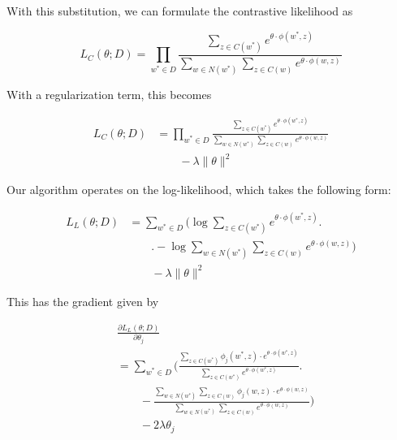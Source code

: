 \documentclass[11pt,twocolumn]{article}
\begin{document}
With this substitution, we can formulate the contrastive likelihood as

\begin{equation}
    L_C(\theta; D) = \prod_{w^*\in D} \frac{\sum_{z\in C(w^*)} e^{\theta\cdot\phi(w^*,z)}} {\sum_{w\in N(w^*)} \sum_{z\in C(w)} e^{\theta\cdot\phi(w,z)}}
\end{equation}

With a regularization term, this becomes

\begin{equation}
    \begin{split}
        L_C(\theta; D) &= \prod_{w^*\in D} \frac{\sum_{z\in C(w^*)} e^{\theta\cdot\phi(w^*,z)}} {\sum_{w\in N(w^*)} \sum_{z\in C(w)} e^{\theta\cdot\phi(w,z)}} \\
        &\qquad - \lambda \|\theta\|^2
    \end{split}
\end{equation}

Our algorithm operates on the log-likelihood, which takes the following form:

\begin{equation}
    \begin{split}
        L_L(\theta; D) &= \sum_{w^*\in D} \Bigg(\log \sum_{z\in C(w^*)} e^{\theta\cdot\phi(w^*,z)} \Bigg.\\
        &\qquad\Bigg. -\log \sum_{w\in N(w^*)} \sum_{z\in C(w)} e^{\theta\cdot\phi(w,z)} \Bigg) \\
        &\qquad - \lambda \|\theta\|^2
    \end{split}
\end{equation}

This has the gradient given by

\begin{equation}
    \begin{split}
        &\frac{\partial L_L(\theta; D)}{\partial \theta_j} \\
        &= \sum_{w^*\in D} \Bigg( \frac{\sum_{z\in C(w^*)} \phi_j(w^*,z)\cdot e^{\theta\cdot\phi(w^*,z)}} {\sum_{z\in C(w^*)} e^{\theta\cdot\phi(w^*,z)}} \Bigg. \\
        &\qquad -\frac{\sum_{w\in N(w^*)} \sum_{z\in C(w)} \phi_j(w,z)\cdot e^{\theta\cdot\phi(w,z)}} {\sum_{w\in N(w^*)} \sum_{z\in C(w)} e^{\theta\cdot\phi(w,z)}} \Bigg) \\
        &\qquad -2\lambda\theta_j
    \end{split}
\end{equation}
\end{document}
